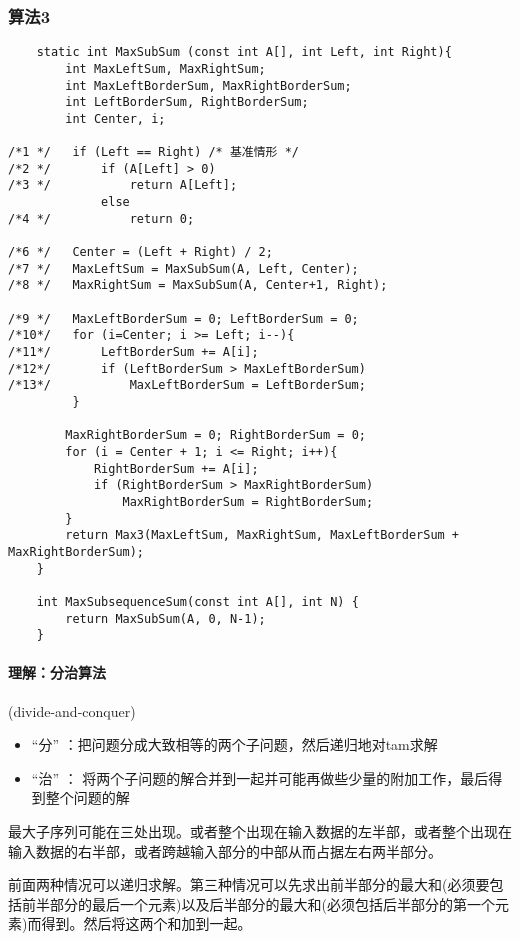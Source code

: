 \documentclass[utf8]{ctexbook}
\begin{document}
\newpage
\subsubsection{算法3}
\begin{lstlisting}
    static int MaxSubSum (const int A[], int Left, int Right){
        int MaxLeftSum, MaxRightSum;
        int MaxLeftBorderSum, MaxRightBorderSum;
        int LeftBorderSum, RightBorderSum;
        int Center, i;

/*1 */   if (Left == Right) /* 基准情形 */ 
/*2 */       if (A[Left] > 0)
/*3 */           return A[Left];
             else
/*4 */           return 0;

/*6 */   Center = (Left + Right) / 2;
/*7 */   MaxLeftSum = MaxSubSum(A, Left, Center);
/*8 */   MaxRightSum = MaxSubSum(A, Center+1, Right);

/*9 */   MaxLeftBorderSum = 0; LeftBorderSum = 0;
/*10*/   for (i=Center; i >= Left; i--){
/*11*/       LeftBorderSum += A[i];
/*12*/       if (LeftBorderSum > MaxLeftBorderSum)
/*13*/           MaxLeftBorderSum = LeftBorderSum;
         }

        MaxRightBorderSum = 0; RightBorderSum = 0;
        for (i = Center + 1; i <= Right; i++){
            RightBorderSum += A[i];
            if (RightBorderSum > MaxRightBorderSum)
                MaxRightBorderSum = RightBorderSum;
        }
        return Max3(MaxLeftSum, MaxRightSum, MaxLeftBorderSum + MaxRightBorderSum);
    }

    int MaxSubsequenceSum(const int A[], int N) {
        return MaxSubSum(A, 0, N-1);
    }
\end{lstlisting}
\newpage 
\paragraph{理解：分治算法}(divide-and-conquer)


\begin{itemize}
    \item “分” ：把问题分成大致相等的两个子问题，然后递归地对tam求解
    \item “治” ： 将两个子问题的解合并到一起并可能再做些少量的附加工作，最后得到整个问题的解
\end{itemize}

最大子序列可能在三处出现。或者整个出现在输入数据的左半部，或者整个出现在输入数据的右半部，或者跨越输入部分的中部从而占据左右两半部分。

前面两种情况可以递归求解。第三种情况可以先求出前半部分的最大和(必须要包括前半部分的最后一个元素)以及后半部分的最大和(必须包括后半部分的第一个元素)而得到。然后将这两个和加到一起。
\end{document}
